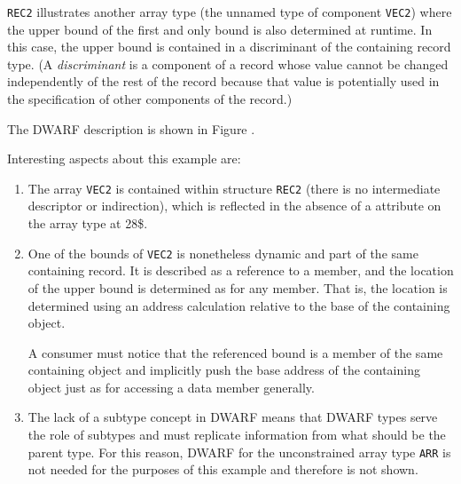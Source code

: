 \texttt{REC2} illustrates another array type (the unnamed type of
component \texttt{VEC2}) where the upper bound of the first and only
bound is also determined at runtime. In this case, the upper
bound is contained in a discriminant of the containing record
type. (A \textit{discriminant} is a component of a record whose value
cannot be changed independently of the rest of the record
because that value is potentially used in the specification
of other components of the record.)

The DWARF description is shown in 
Figure .


Interesting aspects about this example are:
\begin{enumerate}[1. ]
\item The array \texttt{VEC2} is  contained within structure
\texttt{REC2} (there is no intermediate descriptor or indirection),
which is reflected in the absence of a 
attribute on the array type at 28\$.

\item One of the bounds of \texttt{VEC2} is nonetheless dynamic and part of
the same containing record. It is described as a reference to
a member, and the location of the upper bound is determined
as for any member. That is, the location is determined using
an address calculation relative to the base of the containing
object.  

A consumer must notice that the referenced bound is a
member of the same containing object and implicitly push the
base address of the containing object just as for accessing
a data member generally.

\item The lack of a subtype concept in DWARF means that DWARF types
serve the role of subtypes and must replicate information from
what should be the parent type. For this reason, DWARF for
the unconstrained array type \texttt{ARR} is not needed for the purposes
of this example and therefore is not shown.
\end{enumerate}

